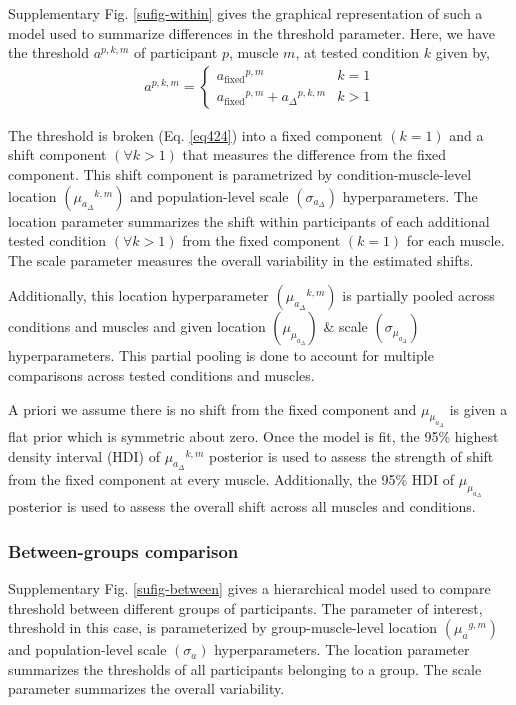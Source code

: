 \documentclass[pdflatex,sn-mathphys-ay]{sn-jnl}%
\numberwithin{equation}{subsection}
\theoremstyle{thmstyleone}%
\theoremstyle{thmstyletwo}%
\theoremstyle{thmstylethree}%
\begin{document}
Supplementary Fig. \ref{sufig-within} gives the graphical representation of such a model used to summarize differences in the threshold parameter. Here, we have the threshold $a^{p,k,m}$ of participant $p$, muscle $m$, at tested condition $k$ given by,
\begin{align}
    a^{p, k, m} = \begin{cases}
        {{a}_\text{fixed}}^{p, m} & k = 1 \\
        {{a}_\text{fixed}}^{p, m} + {{a}_\Delta}^{p, k, m} & k > 1
    \end{cases}\label{eq424}
\end{align}

The threshold is broken (Eq. \ref{eq424}) into a fixed component $\left(k = 1\right)$ and a shift component $\left(\forall k > 1\right)$ that measures the difference from the fixed component. This shift component is parametrized by condition-muscle-level location $\left({\mu_{a_{\Delta}}}^{k,m}\right)$ and population-level scale $\left(\sigma_{a_\Delta}\right)$ hyperparameters. The location parameter summarizes the shift within participants of each additional tested condition $\left(\forall k > 1\right)$ from the fixed component $\left(k = 1\right)$ for each muscle. The scale parameter measures the overall variability in the estimated shifts.

Additionally, this location hyperparameter $\left({\mu_{a_{\Delta}}}^{k,m}\right)$ is partially pooled across conditions and muscles and given location $\left(\mu_{\mu_{a_\Delta}}\right)$ \& scale $\left(\sigma_{\mu_{a_\Delta}}\right)$ hyperparameters. This partial pooling is done to account for multiple comparisons \cite{gelman_type_2000,gelman_why_2009} across tested conditions and muscles.

A priori we assume there is no shift from the fixed component and $\mu_{\mu_{a_\Delta}}$ is given a flat prior which is symmetric about zero. Once the model is fit, the 95\% highest density interval (HDI) of ${\mu_{a_{\Delta}}}^{k,m}$ posterior is used to assess the strength of shift from the fixed component at every muscle. Additionally, the 95\% HDI of $\mu_{\mu_{a_\Delta}}$ posterior is used to assess the overall shift across all muscles and conditions.

\subsubsection{Between-groups comparison}
Supplementary Fig. \ref{sufig-between} gives a hierarchical model used to compare threshold between different groups of participants. The parameter of interest, threshold in this case, is parameterized by group-muscle-level location $\left({\mu_a}^{g,m}\right)$ and population-level scale $\left(\sigma_a\right)$ hyperparameters. The location parameter summarizes the thresholds of all participants belonging to a group. The scale parameter summarizes the overall variability.
\end{document}
